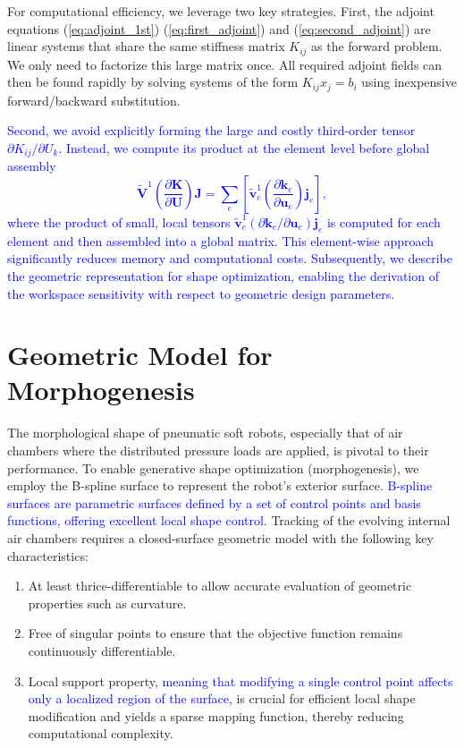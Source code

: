 \documentclass[journal]{IEEEtran}
\theoremstyle{definition}
\begin{document}
For computational efficiency, we leverage two key strategies. First, the adjoint equations (\ref{eq:adjoint_1st}) (\ref{eq:first_adjoint}) and (\ref{eq:second_adjoint}) are linear systems that share the same stiffness matrix $K_{ij}$ as the forward problem. We only need to factorize this large matrix once. All required adjoint fields can then be found rapidly by solving systems of the form $K_{ij} x_j=b_i$ using inexpensive forward/backward substitution.

\textcolor{blue}{Second, we avoid explicitly forming the large and costly third-order tensor $\partial K_{ij}/\partial U_k$. Instead, we compute its product at the element level before global assembly
\begin{equation}
    \mathbf{\tilde{V}}^1 \left(\frac{\partial \mathbf{K}}{\partial \mathbf{U}}\right) \mathbf{J} = \sum_{e} \left[ \mathbf{\tilde{v}}^1_e \left(\frac{\partial \mathbf{k}_e}{\partial \mathbf{u}_e}\right) \mathbf{j}_e \right],
\end{equation}
where the product of small, local tensors $\mathbf{\tilde{v}}^1_e(\partial \mathbf{k}_e / \partial \mathbf{u}_e) \mathbf{j}_e$ is computed for each element and then assembled into a global matrix. This element-wise approach significantly reduces memory and computational costs.}
\textcolor{blue}{Subsequently, we describe the geometric representation for shape optimization, enabling the derivation of the workspace sensitivity with respect to geometric design parameters.}

\section{Geometric Model for Morphogenesis}
\label{sec:sphere_mapping}



The morphological shape of pneumatic soft robots, especially that of air chambers where the distributed pressure loads are applied, is pivotal to their performance. To enable generative shape optimization (morphogenesis), we employ the B-spline surface to represent the robot's exterior surface. \textcolor{blue}{B-spline surfaces are parametric surfaces defined by a set of control points and basis functions, offering excellent local shape control.} Tracking of the evolving internal air chambers requires a closed-surface geometric model with the following key characteristics:
\begin{enumerate}
  \item At least thrice-differentiable to allow accurate evaluation of geometric properties such as curvature.
  \item Free of singular points to ensure that the objective function remains continuously differentiable.
  \item Local support property, \textcolor{blue}{meaning that modifying a single control point affects only a localized region of the surface,} is crucial for efficient local shape modification and yields a sparse mapping function, thereby reducing computational complexity.

\end{enumerate}
\end{document}
